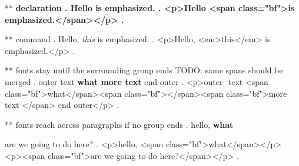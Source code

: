 ** \bfseries declaration
.
Hello \bfseries is emphasized.
.
<p>Hello <span class="bf">is emphasized.</span></p>
.

** \emph{} command
.
Hello, \emph{this} is emphasized.
.
<p>Hello, <em>this</em> is emphasized.</p>
.


** fonts stay until the surrounding group ends      TODO: same spans should be merged
.
outer { text \bfseries {what} more text } end outer
.
<p>outer ​ text <span class="bf">what</span><span class="bf">​ </span><span class="bf">more text </span>​ end outer</p>
.


** fonts reach across paragraphs if no group ends
.
hello, \bfseries what

are we going to do here?
.
<p>hello, <span class="bf">what</span></p>
<p><span class="bf">are we going to do here?</span></p>
.
